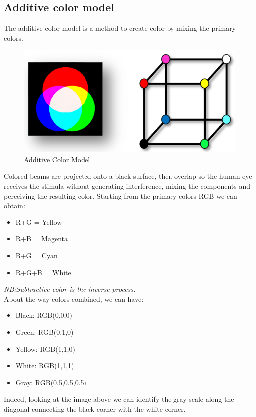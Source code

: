 \subsection{Additive color model}
The additive color model is a method to create color by mixing the primary colors.
\begin{figure}[h]
    \centering
    \includegraphics[scale=0.5]{Figures/AdditiveModel.png}
    \caption{Additive Color Model}
    \label{fig:enter-label}
\end{figure}

Colored beams are projected onto a black surface, then overlap so the human eye receives the stimula without generating interference, mixing the components and perceiving the resulting color.
Starting from the primary colors RGB we can obtain:
\begin{itemize}
    \item R+G = Yellow
    \item R+B = Magenta
    \item B+G = Cyan
    \item R+G+B = White
\end{itemize}
\textit{NB:Subtractive color is the inverse process.}\\
About the way colors combined, we can have:
\begin{itemize}
    \item Black: RGB(0,0,0)
    \item Green: RGB(0,1,0)
    \item Yellow: RGB(1,1,0)
    \item White: RGB(1,1,1)
    \item Gray: RGB(0.5,0.5,0.5)
\end{itemize}

Indeed, looking at the image above we can identify the gray scale along the diagonal connecting the black corner with the white corner.

